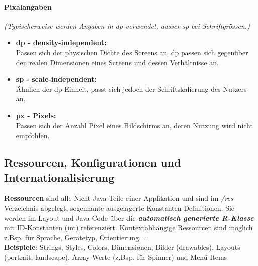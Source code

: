 \documentclass[a4paper]{article}
\begin{document}
\paragraph{Pixalangaben}
\textit{(Typischerweise werden Angaben in dp verwendet, ausser sp bei Schriftgrössen.)}
\begin{itemize}
	\item \textbf{dp - density-independent:} \\ Passen sich der physischen Dichte des Screens an, dp passen sich gegenüber den realen Dimensionen eines Screens und dessen Verhältnisse an.
	\item \textbf{sp - scale-independent:} \\Ähnlich der dp-Einheit, passt sich jedoch der Schriftskalierung des Nutzers an.
	\item \textbf{px - Pixels:} \\Passen sich der Anzahl Pixel eines Bildschirms an, deren Nutzung wird nicht empfohlen.
\end{itemize}

\newpage

\subsection{Ressourcen, Konfigurationen und Internationalisierung}
\textbf{Ressourcen} sind alle Nicht-Java-Teile einer Applikation und sind im \textit{/res}-Verzeichnis abgelegt, sogennante ausgelagerte Konstanten-Definitionen. Sie werden im Layout und Java-Code über die \textbf{\textit{automatisch generierte R-Klasse}} mit ID-Konstanten (int) referenziert. Kontextabhängige Ressourcen sind möglich z.Bsp. für Sprache, Gerätetyp, Orientierung, ...\\
\textbf{Beispiele}: Strings, Styles, Colors, Dimensionen, Bilder (drawables), Layouts (portrait, landscape), Array-Werte (z.Bsp. für Spinner) und Menü-Items\\
\end{document}
